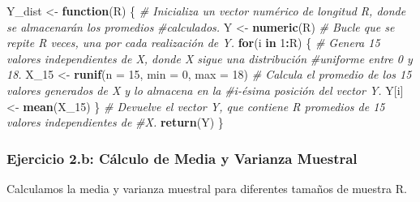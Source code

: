 \documentclass[
]{article}
\newenvironment{Shaded}{\begin{snugshade}}{\end{snugshade}}
\newcommand{\AttributeTok}[1]{\textcolor[rgb]{0.13,0.29,0.53}{#1}}
\newcommand{\CommentTok}[1]{\textcolor[rgb]{0.56,0.35,0.01}{\textit{#1}}}
\newcommand{\ControlFlowTok}[1]{\textcolor[rgb]{0.13,0.29,0.53}{\textbf{#1}}}
\newcommand{\DecValTok}[1]{\textcolor[rgb]{0.00,0.00,0.81}{#1}}
\newcommand{\FunctionTok}[1]{\textcolor[rgb]{0.13,0.29,0.53}{\textbf{#1}}}
\newcommand{\NormalTok}[1]{#1}
\newcommand{\OtherTok}[1]{\textcolor[rgb]{0.56,0.35,0.01}{#1}}
\newcommand{\SpecialCharTok}[1]{\textcolor[rgb]{0.81,0.36,0.00}{\textbf{#1}}}
\begin{document}
\begin{Shaded}
\begin{Highlighting}[]
\NormalTok{Y\_dist }\OtherTok{\textless{}{-}} \ControlFlowTok{function}\NormalTok{(R) \{}
  \CommentTok{\# Inicializa un vector numérico de longitud R, donde se almacenarán los promedios}
  \CommentTok{\#calculados.}
\NormalTok{  Y }\OtherTok{\textless{}{-}} \FunctionTok{numeric}\NormalTok{(R)}
  \CommentTok{\# Bucle que se repite R veces, una por cada realización de Y.}
  \ControlFlowTok{for}\NormalTok{(i }\ControlFlowTok{in} \DecValTok{1}\SpecialCharTok{:}\NormalTok{R) \{}
    \CommentTok{\# Genera 15 valores independientes de X, donde X sigue una distribución}
    \CommentTok{\#uniforme entre 0 y 18.}
\NormalTok{    X\_15 }\OtherTok{\textless{}{-}} \FunctionTok{runif}\NormalTok{(}\AttributeTok{n =} \DecValTok{15}\NormalTok{, }\AttributeTok{min =} \DecValTok{0}\NormalTok{, }\AttributeTok{max =} \DecValTok{18}\NormalTok{)}
    \CommentTok{\# Calcula el promedio de los 15 valores generados de X y lo almacena en la }
    \CommentTok{\#i{-}ésima posición del vector Y.}
\NormalTok{    Y[i] }\OtherTok{\textless{}{-}} \FunctionTok{mean}\NormalTok{(X\_15)}
\NormalTok{  \}}
  \CommentTok{\# Devuelve el vector Y, que contiene R promedios de 15 valores independientes de}
  \CommentTok{\#X.}
  \FunctionTok{return}\NormalTok{(Y)}
\NormalTok{\}}
\end{Highlighting}
\end{Shaded}

\subsubsection{Ejercicio 2.b: Cálculo de Media y Varianza
Muestral}\label{ejercicio-2.b-cuxe1lculo-de-media-y-varianza-muestral}

Calculamos la media y varianza muestral para diferentes tamaños de
muestra R.
\end{document}
